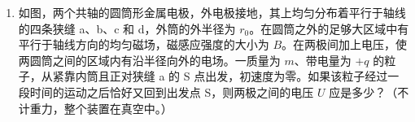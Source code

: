 \documentclass[\gkver]{gaokaozhenti}
\begin{document}
\begin{enumerate}
{设嘉峪关到同步卫星的距离为 $L$，如图所示，由余弦定理

$L=\sqrt{r^{2}+R^{2}-2rR\cos\alpha}$ ④

所求时间为

$t=\frac{L}{c}$ ⑤

由以上各式得

$t=\frac{\sqrt{\left(\frac{R^{2}gT^{2}}{4\pi^{2}}\right)^{2/3}+R^{2}-2R\left(\frac{R^{2}gT^{2}}{4\pi^{2}}\right)^{1/3}\cos\alpha}}{c}$ ⑥


评分标准：本题 12 分，①式 1 分，②式 2 分，③式 1 分，④式 5 分，⑤式 1 分，⑥式 2 分。
}

\item
如图，两个共轴的圆筒形金属电极，外电极接地，其上均匀分布着平行于轴线的四条狭缝 a、b、c 和 d，外筒的外半径为 $r_{0}$。在圆筒之外的足够大区域中有平行于轴线方向的均匀磁场，磁感应强度的大小为 $B$。在两极间加上电压，使两圆筒之间的区域内有沿半径向外的电场。一质量为 $m$、带电量为 $+q$ 的粒子，从紧靠内筒且正对狭缝 a 的 S 点出发，初速度为零。如果该粒子经过一段时间的运动之后恰好又回到出发点 S，则两极之间的电压 $U$ 应是多少？（不计重力，整个装置在真空中。）


\end{enumerate}
\end{document}
